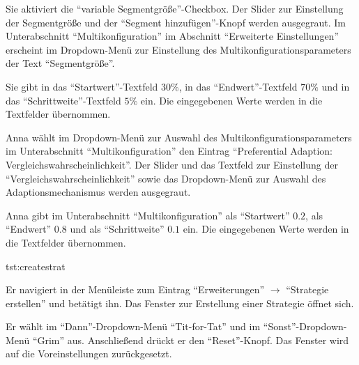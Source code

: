 \documentclass[parskip=full,11pt]{scrartcl}
\begin{document}
{Sie aktiviert die \enquote{variable Segmentgröße}-Checkbox.}
{Der Slider zur Einstellung der Segmentgröße und der \enquote{Segment hinzufügen}-Knopf werden ausgegraut. Im Unterabschnitt \enquote{Multikonfiguration} im Abschnitt \enquote{Erweiterte Einstellungen} erscheint im Dropdown-Menü zur Einstellung des Multikonfigurationsparameters der Text \enquote{Segmentgröße}.}

{Sie gibt in das \enquote{Startwert}-Textfeld \(30\%\), in das \enquote{Endwert}-Textfeld \(70\%\) und in das \enquote{Schrittweite}-Textfeld \(5\%\) ein.}
{Die eingegebenen Werte werden in die Textfelder übernommen.}

{Anna wählt im Dropdown-Menü zur Auswahl des Multikonfigurationsparameters im Unterabschnitt \enquote{Multikonfiguration} den Eintrag \enquote{Preferential Adaption: Vergleichswahrscheinlichkeit}.}
{Der Slider und das Textfeld zur Einstellung der \enquote{Vergleichswahrscheinlichkeit} sowie das Dropdown-Menü zur Auswahl des Adaptionsmechanismus werden ausgegraut.}

{Anna gibt im Unterabschnitt \enquote{Multikonfiguration} als \enquote{Startwert} \(0.2\), als \enquote{Endwert} \(0.8\) und als \enquote{Schrittweite} \(0.1\) ein.}
{Die eingegebenen Werte werden in die Textfelder übernommen.}

{tst:createstrat}

{Er navigiert in der Menüleiste zum Eintrag \enquote{Erweiterungen} \(\rightarrow\) \enquote{\Gls{Strategie} erstellen} und betätigt ihn.}
{Das Fenster zur Erstellung einer \Gls{Strategie} öffnet sich.}

{Er wählt im \enquote{Dann}-Dropdown-Menü \enquote{Tit-for-Tat} und im \enquote{Sonst}-Dropdown-Menü \enquote{Grim} aus. Anschließend drückt er den \enquote{Reset}-Knopf.}
{Das Fenster wird auf die Voreinstellungen zurückgesetzt.}
\end{document}
